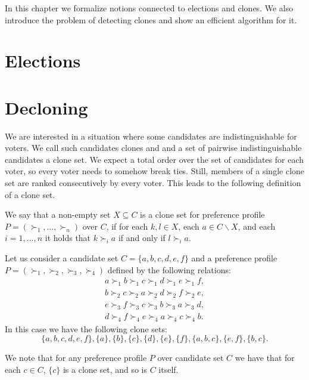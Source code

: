 In this chapter we formalize notions connected to elections and clones.
We also introduce the problem of detecting clones and show an efficient algorithm for it.

\section{Elections} 

\section{Decloning}

We are interested in a situation where some candidates are indistinguishable for voters.
We call such candidates clones and and a set of pairwise indistinguishable candidates a clone set.
We expect a total order over the set of candidates for each voter,
so every voter needs to somehow break ties.
Still, members of a single clone set are ranked consecutively by every voter.
This leads to the following definition of a clone set.

\begin{defn}
We say that a non-empty set $X \subseteq C$ is a clone set
for preference profile $P = (\succ_1, ... , \succ_n)$ over $C$,
if for each $k,l \in X$, each $a \in C \backslash X$, and each $i=1, ..., n$ it holds that
$k \succ_i a$ if and only if $l \succ_i a$.
\end{defn}

\begin{exmp} \label{clone-sets}
Let us consider a candidate set $C = \{a,b,c,d,e,f\}$
and a preference profile $P = (\succ_1, \succ_2, \succ_3, \succ_4)$ defined by the following relations:
\begin{align*}
a \succ_1 b \succ_1 c \succ_1 d \succ_1 e \succ_1 f, \\
b \succ_2 c \succ_2 a \succ_2 d \succ_2 f \succ_2 e, \\
e \succ_3 f \succ_3 c \succ_3 b \succ_3 a \succ_3 d, \\
d \succ_4 f \succ_4 e \succ_4 a \succ_4 c \succ_4 b.
\end{align*}
In this case we have the following clone sets:
$$\{a,b,c,d,e,f\}, \{a\}, \{b\}, \{c\}, \{d\}, \{e\}, \{f\}, \{a,b,c\}, \{e,f\}, \{b,c\}.$$
\end{exmp}

\begin{rmrk}
We note that for any preference profile $P$ over candidate set $C$
we have that for each $c \in C$, $\{c\}$ is a clone set, and so is $C$ itself.
\end{rmrk}

